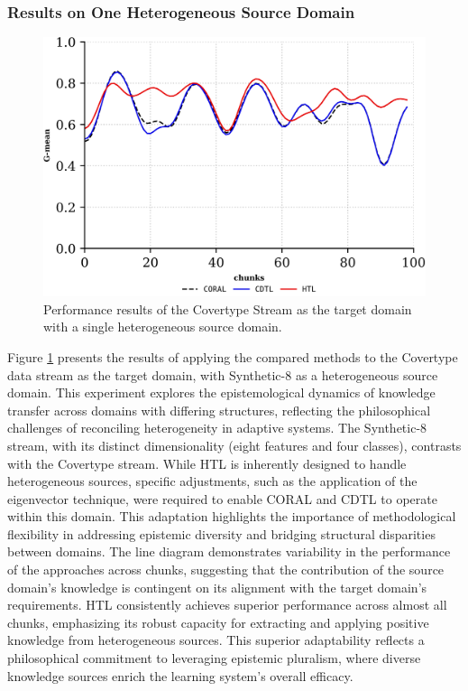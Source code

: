 \subsubsection{Results on One Heterogeneous Source Domain}
\begin{figure}[H]
	\centering
	\includegraphics[width=0.6\linewidth]{6_transfer_learning/figures/exp2_0.png}
  \caption{Performance results of the Covertype Stream as the target domain with a single heterogeneous source domain.}

	\label{fig:6_exp3}
\end{figure}
Figure \ref{fig:6_exp3} presents the results of applying the compared methods to the Covertype data stream as the target domain, with Synthetic-8 as a heterogeneous source domain. This experiment explores the epistemological dynamics of knowledge transfer across domains with differing structures, reflecting the philosophical challenges of reconciling heterogeneity in adaptive systems. The Synthetic-8 stream, with its distinct dimensionality (eight features and four classes), contrasts with the Covertype stream. While HTL is inherently designed to handle heterogeneous sources, specific adjustments, such as the application of the eigenvector technique, were required to enable CORAL and CDTL to operate within this domain. This adaptation highlights the importance of methodological flexibility in addressing epistemic diversity and bridging structural disparities between domains.  
The line diagram demonstrates variability in the performance of the approaches across chunks, suggesting that the contribution of the source domain's knowledge is contingent on its alignment with the target domain’s requirements. HTL consistently achieves superior performance across almost all chunks, emphasizing its robust capacity for extracting and applying positive knowledge from heterogeneous sources. This superior adaptability reflects a philosophical commitment to leveraging epistemic pluralism, where diverse knowledge sources enrich the learning system’s overall efficacy.  

